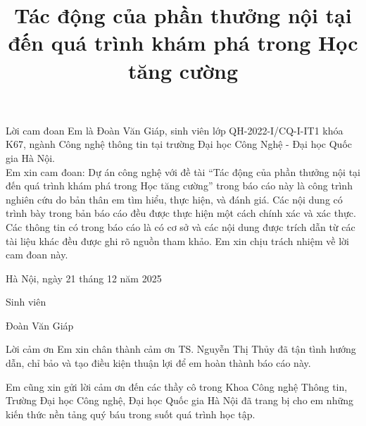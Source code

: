 \documentclass{uetgraduation}
\begin{document}
\title{Tác động của phần thưởng nội tại đến quá trình khám phá trong Học tăng cường}

\makecovers %


\begin{preamble}{Lời cam đoan}
Em là Đoàn Văn Giáp, sinh viên lớp QH-2022-I/CQ-I-IT1 khóa K67, ngành Công nghệ thông tin tại trường Đại học Công Nghệ - Đại học Quốc gia Hà Nội.\\
Em xin cam đoan: Dự án công nghệ với đề tài ``Tác động của phần thưởng nội tại đến quá trình khám phá trong Học tăng cường'' trong báo cáo này là công trình nghiên cứu do bản thân em tìm hiểu, thực hiện, và đánh giá. Các nội dung có trình bày trong bản báo cáo đều được thực hiện một cách chính xác và xác thực.\\
Các thông tin có trong báo cáo là có cơ sở và các nội dung được trích dẫn từ các tài liệu khác đều được ghi rõ nguồn tham khảo. Em xin chịu trách nhiệm về lời
cam đoan này.

\vspace{2cm}

\begin{flushright}
Hà Nội, ngày 21 tháng 12 năm 2025

\vspace{1\baselineskip}

\begin{minipage}{6cm}
\centering
Sinh viên

\vspace{4\baselineskip}

Đoàn Văn Giáp
\end{minipage}
\end{flushright}


\end{preamble}

\begin{preamble}{Lời cảm ơn}
Em xin chân thành cảm ơn TS. Nguyễn Thị Thủy đã tận tình hướng dẫn, chỉ bảo và tạo điều kiện thuận lợi để em hoàn thành báo cáo này. 

Em cũng xin gửi lời cảm ơn đến các thầy cô trong Khoa Công nghệ Thông tin, Trường Đại học Công nghệ, Đại học Quốc gia Hà Nội đã trang bị cho em những kiến thức nền tảng quý báu trong suốt quá trình học tập.
\end{preamble}
\end{document}
